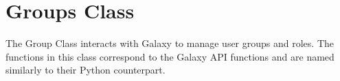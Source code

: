 \hypertarget{group__group__class}{}\section{Groups Class}
\label{group__group__class}
The Group Class interacts with Galaxy to manage user groups and roles. The functions in this class correspond to the Galaxy A\+PI functions and are named similarly to their Python counterpart. 